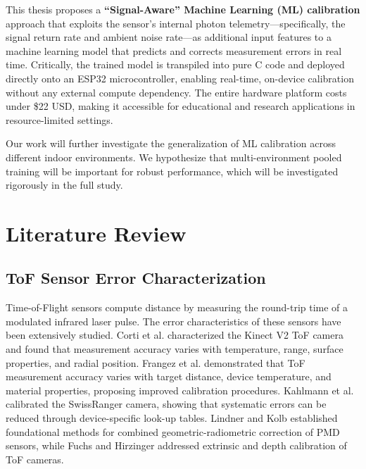 \documentclass[12pt,a4paper]{article}
\begin{document}
    This thesis proposes a \textbf{``Signal-Aware'' Machine Learning (ML) calibration} approach that exploits the sensor's internal photon telemetry---specifically, the signal return rate and ambient noise rate---as additional input features to a machine learning model that predicts and corrects measurement errors in real time. Critically, the trained model is transpiled into pure C code and deployed directly onto an ESP32 microcontroller, enabling real-time, on-device calibration without any external compute dependency. The entire hardware platform costs under \$22 USD, making it accessible for educational and research applications in resource-limited settings.

    Our work will further investigate the generalization of ML calibration across different indoor environments. We hypothesize that multi-environment pooled training will be important for robust performance, which will be investigated rigorously in the full study.



    \section{Literature Review}

    \subsection{ToF Sensor Error Characterization}

    Time-of-Flight sensors compute distance by measuring the round-trip time of a modulated infrared laser pulse. The error characteristics of these sensors have been extensively studied. Corti et al. \cite{corti2016metrological} characterized the Kinect V2 ToF camera and found that measurement accuracy varies with temperature, range, surface properties, and radial position. Frangez et al. \cite{frangez2022assessment} demonstrated that ToF measurement accuracy varies with target distance, device temperature, and material properties, proposing improved calibration procedures. Kahlmann et al. \cite{kahlmann2006calibration} calibrated the SwissRanger camera, showing that systematic errors can be reduced through device-specific look-up tables. Lindner and Kolb \cite{lindner2006lateral} established foundational methods for combined geometric-radiometric correction of PMD sensors, while Fuchs and Hirzinger \cite{fuchs2008extrinsic} addressed extrinsic and depth calibration of ToF cameras.
\end{document}
